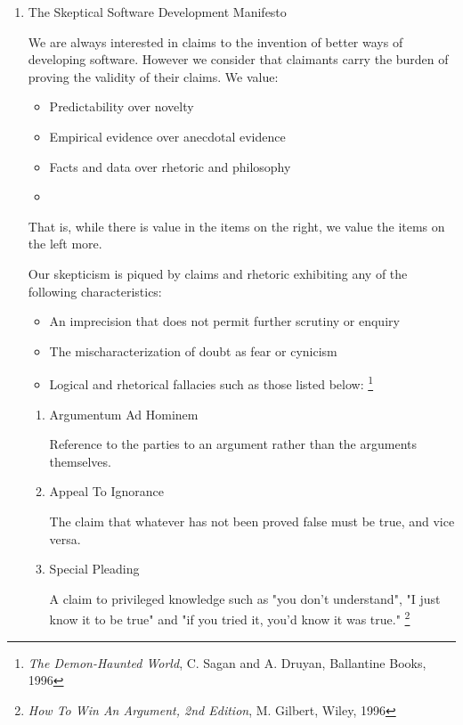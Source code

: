 \documentclass{article}
\begin{document}
\begin{enumerate}
\item The Skeptical Software Development Manifesto
\label{sec:orgheadline358}

We are always interested in claims to the invention of better ways of
developing software. However we consider that claimants carry the burden
of proving the validity of their claims. We value:

\begin{itemize}
\item Predictability over novelty
\item Empirical evidence over anecdotal evidence
\item Facts and data over rhetoric and philosophy
\item 
\end{itemize}

That is, while there is value in the items on the right, we value the
items on the left more.

Our skepticism is piqued by claims and rhetoric exhibiting any of the
following characteristics:

\begin{itemize}
\item An imprecision that does not permit further scrutiny or enquiry
\item The mischaracterization of doubt as fear or cynicism
\item Logical and rhetorical fallacies such as those listed below: \footnote{\emph{The Demon-Haunted World}, C. Sagan and A. Druyan, Ballantine
Books, 1996}
\end{itemize}

\begin{enumerate}
\item Argumentum Ad Hominem
\label{sec:orgheadline346}

Reference to the parties to an argument rather than the arguments
themselves.

\item Appeal To Ignorance
\label{sec:orgheadline347}

The claim that whatever has not been proved false must be true, and vice
versa.

\item Special Pleading
\label{sec:orgheadline348}

A claim to privileged knowledge such as "you don't understand", "I just
know it to be true" and "if you tried it, you'd know it was true." \footnote{\emph{How To Win An Argument, 2nd Edition}, M. Gilbert, Wiley, 1996}


\end{enumerate}
\end{enumerate}
\end{document}
